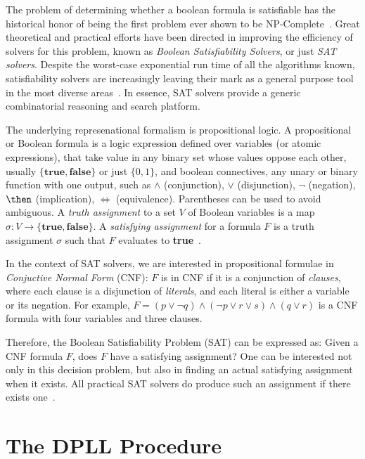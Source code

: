 The problem of determining whether a boolean formula is satisfiable has the
historical honor of being the first problem ever shown to be
NP-Complete~\cite{Cook}. Great theoretical and practical efforts have been directed
in improving the efficiency of solvers for this problem, known as \emph{Boolean
Satisfiability Solvers}, or just \emph{SAT solvers}. Despite the worst-case
exponential run time of all the algorithms known, satisfiability solvers are
increasingly leaving their mark as a general purpose tool in the most diverse
areas~\cite{satchapter}. In essence, SAT solvers provide a generic combinatorial
reasoning and search platform. 

The underlying represenational formalism is propositional logic. A propositional
or Boolean formula is a logic expression defined over variables (or atomic
expressions), that take value in any binary set whose values oppose each other,
usually $\{\textbf{true}, \textbf{false}\}$ or just $\{0,1\}$, and boolean
connectives, any unary or binary function with one output, such as
$\land$ (conjunction), $\lor$ (disjunction), $\neg$ (negation), $\then$
(implication), $\iff$ (equivalence). Parentheses can be used to avoid ambiguous.
A \emph{truth assignment} to a set $V$ of Boolean variables is a map $\sigma : V
\rightarrow \{\textbf{true}, \textbf{false}\}$. A \emph{satisfying assignment}
for a formula $F$ is a truth assignment $\sigma$ such that $F$ evaluates to
\textbf{true}~\cite{satchapter}.

In the context of SAT solvers, we are interested in propositional formulae in
\emph{Conjuctive Normal Form} (CNF): $F$ is in CNF if it is a conjunction of
\emph{clauses}, where each clause is a disjunction of \emph{literals}, and each
literal is either a variable or its negation. For example, $F = (p \lor \neg q)
\land (\neg p \lor r \lor s) \land (q \lor r)$ is a CNF formula with four variables and
three clauses.

Therefore, the Boolean Satisfiability Problem (SAT) can be expressed as: Given a
CNF formula $F$, does $F$ have a satisfying assignment? One can be interested
not only in this decision problem, but also in finding an actual satisfying
assignment when it exists. All practical SAT solvers do produce such an
assignment if there exists one~\cite{cormen}.

\section{The DPLL Procedure}
\label{sec:dpll}

